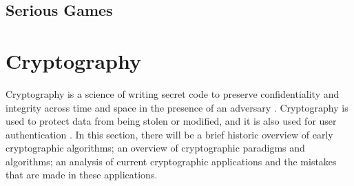\documentclass{l4proj}
\begin{document}
\subsection{Serious Games}

\section{Cryptography}

Cryptography is a science of writing secret code to preserve confidentiality and integrity across time and space in the presence of an adversary \citep{kessler_overview_2016} 
\citep{savage_cse_2019}. Cryptography is used to protect data from being stolen or modified, and it is also used for user authentication \citep{kessler_overview_2016}. 
In this section, there will be a brief historic overview of early cryptographic algorithms; an overview of cryptographic paradigms and algorithms; 
an analysis of current cryptographic applications and the mistakes that are made in these applications.
\end{document}
